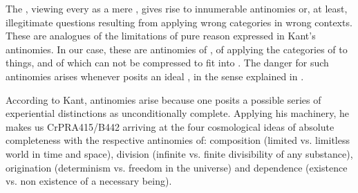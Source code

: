 \label{sub:antinomies}\label{antinomies}

\pa The , viewing every  as a
mere , gives rise to innumerable antinomies or, at least,
illegitimate questions resulting from applying wrong categories in wrong
contexts. These are analogues of the limitations of pure reason expressed in
Kant's antinomies. 
In our case, these are {antinomies of }, of applying the
categories of  to things,  and
 of  which can not be compressed to fit into \hoa.
The danger for such antinomies arises whenever  posits an
ideal , in the sense explained in .

According to Kant, antinomies arise because one posits a possible series of
experiential distinctions as unconditionally complete. Applying his machinery,
he makes us \citet{select out those categories which necessarily lead to a
  series in the synthesis of the manifold,}{CrPR}{A415/B442} arriving at the
four cosmological ideas of absolute completeness with the respective antinomies
of: composition (limited vs.  limitless world in time and space), division
(infinite vs. finite divisibility of any substance), origination (determinism
vs. freedom in the universe) and dependence (existence vs. non existence of a
necessary being).

